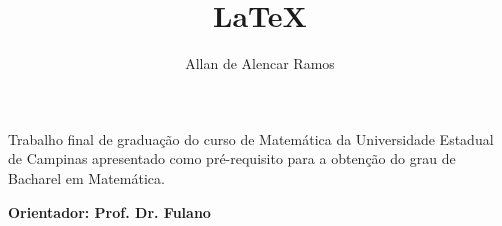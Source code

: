 \documentclass[12pt, a4paper]{article}
\begin{document}
\title{LaTeX}
\author{Allan de Alencar Ramos}
\maketitle

\mbox{}

\vspace{5cm}




\begin{flushright}
\begin{minipage}{10cm}
\hrulefill

Trabalho final de graduação do curso de Matemática da Universidade Estadual de Campinas apresentado como pré-requisito para a obtenção do grau de Bacharel em Matemática.

\hrulefill

\textbf{Orientador: Prof. Dr. Fulano}

\end{minipage}
\end{flushright}
\end{document}
